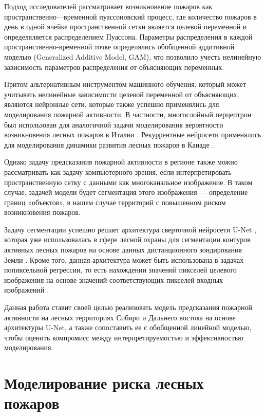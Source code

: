 \documentclass[a4paper,article,14pt]{extarticle}
\begin{document}
Подход исследователей рассматривает возникновение пожаров как пространственно—временной пуассоновский процесс, где количество пожаров в день в одной ячейке пространственной сетки является целевой переменной и определяляется распределением Пуассона. Параметры распределения в каждой пространственно-временной точке определялись обобщенной аддитивной моделью (Generalized Additive Model, GAM), что позволило учесть нелинейную зависимость параметров распределения от объясняющих переменных.

Притом альтернативным инструментом машинного обучения, который может учитывать нелинейные зависимости целевой переменной от объясняющих, являются нейронные сети, которые также успешно применялись для моделирования пожарной активности. В частности, многослойный перцептрон был использован для аналогичной задачи моделирования вероятности возникновения лесных пожаров в Италии \cite{EliaEstimatingProbabilityWildfire2020}. Рекуррентные нейросети применялись для моделирования динамики развития лесных пожаров в Канаде \cite{LiangNeuralNetworkModel2019}.

Однако задачу предсказания пожарной активности в регионе также можно рассматривать как задачу компьютерного зрения, если интерпретировать пространственную сетку с данными как многоканальное изображение. В таком случае, задачей модели будет сегментация этого изображения — определение границ «объектов», в нашем случае территорий с повышенном риском возникновения пожаров.

Задачу сегментации успешно решает архитектура сверточной нейросети U-Net \cite{RonnebergerUNetConvolutionalNetworks2015}, которая уже использовалась в сфере лесной охраны для сегментации контуров активных лесных пожаров на основе данных дистанционного зондирования Земли \cite{deAlmeidaPereiraActiveFireDetection2021}. Кроме того, данная архитектура может быть использована в задачах попиксельной регрессии, то есть нахождении значений пикселей целевого изображения на основе значений соответствующих пикселей входных изображений \cite{YaoPixelwiseRegressionUsing2018}.

Данная работа ставит своей целью реализовать модель предсказания пожарной активности на лесных территориях Сибири и Дальнего востока на основе архитектуры U-Net, а также сопоставить ее с обобщенной линейной моделью, чтобы оценить компромисс между интерпретируемостью и эффективностью моделирования.

\pagebreak
\section{Моделирование риска лесных пожаров}
\end{document}
